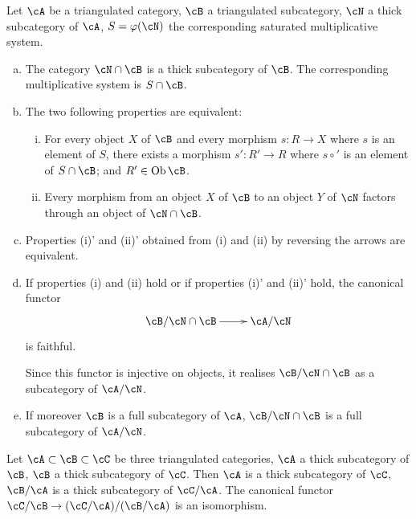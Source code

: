 \begin{theorem}\label{VIII:2-4-2}
Let $\cA$ be a triangulated category, $\cB$ a triangulated
subcategory, $\cN$ a thick subcategory of $\cA$, $S=\varphi(\cN)$
the corresponding saturated multiplicative system.
\begin{enumerate}[(a)]
  \item The category $\cN\cap\cB$ is a thick subcategory of
    $\cB$. The corresponding multiplicative system is $S\cap \cB$.
  \item The two following properties are equivalent:
    \begin{enumerate}[(i)]
      \item For every object $X$ of $\cB$ and every morphism $s:R\to X$ where $s$
        is an element of $S$, there exists a morphism $s':R'\to R$ where
        $s\circ'$ is an element of $S\cap \cB$; and
        $R'\in\operatorname{Ob}\cB$.
      \item Every morphism from an object $X$ of $\cB$ to an object $Y$ of $\cN$
        factors through an object of $\cN\cap \cB$.
    \end{enumerate}
  \item Properties (i)' and (ii)' obtained from (i) and (ii) by
    reversing the arrows are equivalent.
  \item If properties (i) and (ii) hold or if
    properties (i)' and (ii)' hold, the canonical functor
    \[\xymatrix{
      \cB/\cN\cap \cB \ar[r] & \cA/\cN
    }\]
    is faithful.

    Since this functor is injective on objects, it realises
    $\cB/\cN\cap\cB$ as a subcategory of $\cA/\cN$.
  \item If moreover $\cB$ is a full subcategory of $\cA$,
    $\cB/\cN\cap \cB$ is a full subcategory of $\cA/\cN$. 
\end{enumerate}
\end{theorem}





\begin{corollary}\label{VIII:2-4-3}
Let $\cA\subset \cB\subset \cC$ be three triangulated categories, $\cA$ a thick
subcategory of $\cB$, $\cB$ a thick subcategory of $\cC$.
Then $\cA$ is a thick subcategory of $\cC$, $\cB/\cA$ is a
thick subcategory of $\cC/\cA$. The canonical functor
$\cC/\cB \to (\cC/\cA)/(\cB/\cA)$ is an isomorphism. 
\end{corollary}










